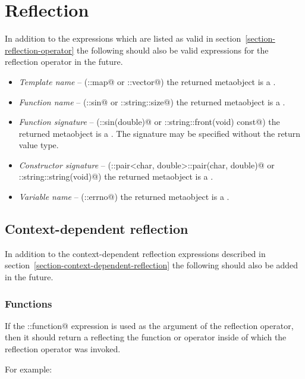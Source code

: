 \section{Reflection}

In addition to the expressions which are listed as valid
in section~\ref{section-reflection-operator} the following should
also be valid expressions for the reflection operator in the future.

\begin{itemize}
\item{{\em Template name}} -- (\verb@std::map@ or \verb@std::vector@)
     the returned metaobject is a {}.
\item{{\em Function name}} -- (\verb@std::sin@ or \verb@std::string::size@) the returned metaobject
     is a {}.
\item{{\em Function signature}} -- (\verb@std::sin(double)@ or \verb@std::string::front(void) const@)
     the returned metaobject is a {}. The signature may be specified without the
     return value type.
\item{{\em Constructor signature}} -- (\verb@std::pair<char, double>::pair(char, double)@
     or \verb@std::string::string(void)@) the returned metaobject is a {}.
\item{{\em Variable name}} -- (\verb@std::errno@) the returned metaobject is a {}.
\end{itemize}

\subsection{Context-dependent reflection}

In addition to the context-dependent reflection expressions described
in section~\ref{section-context-dependent-reflection} the following
should also be added in the future.

\subsubsection{Functions}

If the \verb@this::function@ expression is used as the argument of the reflection
operator, then it should return a  reflecting the function or operator
inside of which the reflection operator was invoked.

For example:

